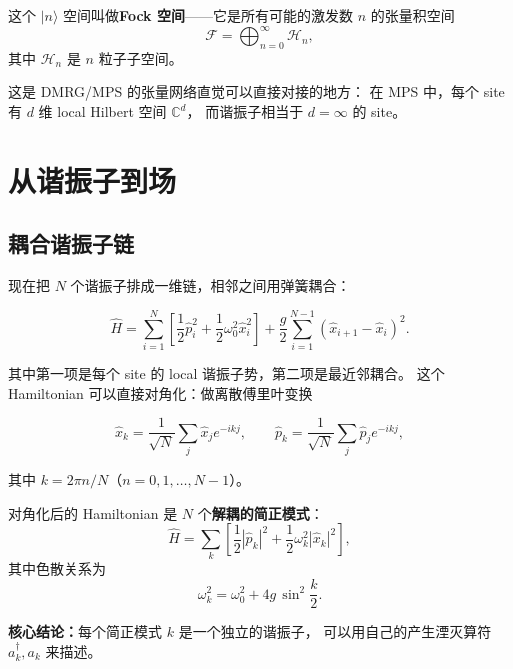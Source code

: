 \documentclass[12pt,a4paper]{article}
\begin{document}
这个 $|n\rangle$ 空间叫做\textbf{Fock 空间}——它是所有可能的激发数 $n$ 的张量积空间
\begin{equation}
\mathcal{F} = \bigoplus_{n=0}^\infty \mathcal{H}_n,
\label{eq:fock-space}
\end{equation}
其中 $\mathcal{H}_n$ 是 $n$ 粒子子空间。

这是 DMRG/MPS 的张量网络直觉可以直接对接的地方：
在 MPS 中，每个 site 有 $d$ 维 local Hilbert 空间 $\mathbb{C}^d$，
而谐振子相当于 $d = \infty$ 的 site。

\section{从谐振子到场}

\subsection{耦合谐振子链}

现在把 $N$ 个谐振子排成一维链，相邻之间用弹簧耦合：

\begin{equation}
\hat H = \sum_{i=1}^N \left[\frac{1}{2}\hat p_i^2 + \frac{1}{2}\omega_0^2 \hat x_i^2\right]
+ \frac{g}{2}\sum_{i=1}^{N-1} (\hat x_{i+1} - \hat x_i)^2.
\label{eq:chain-ham}
\end{equation}

其中第一项是每个 site 的 local 谐振子势，第二项是最近邻耦合。
这个 Hamiltonian 可以直接对角化：做离散傅里叶变换

\begin{equation}
\hat x_k = \frac{1}{\sqrt{N}}\sum_j \hat x_j e^{-ikj},
\qquad
\hat p_k = \frac{1}{\sqrt{N}}\sum_j \hat p_j e^{-ikj},
\label{eq:fourier}
\end{equation}

其中 $k = 2\pi n/N$（$n = 0, 1, \ldots, N-1$）。

对角化后的 Hamiltonian 是 $N$ 个\textbf{解耦的简正模式}：
\begin{equation}
\hat H = \sum_k \left[\frac{1}{2}|\hat p_k|^2 + \frac{1}{2}\omega_k^2 |\hat x_k|^2\right],
\label{eq:diag-ham}
\end{equation}
其中色散关系为
\begin{equation}
\omega_k^2 = \omega_0^2 + 4g\, \sin^2\frac{k}{2}.
\label{eq:dispersion}
\end{equation}

\textbf{核心结论：}每个简正模式 $k$ 是一个独立的谐振子，
可以用自己的产生湮灭算符 $a_k^\dagger, a_k$ 来描述。
\end{document}
